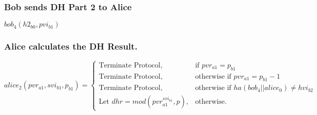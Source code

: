 \documentclass[11pt]{article}
\begin{document}
  \subsubsection{Bob sends DH Part 2 to Alice}
  $bob_4(h2_{b0},pvi_{b1})$

  \subsubsection{Alice calculates the DH Result.}
  \[
    alice_2(pvr_{a1},svi_{b1},p_{b1})=
    \begin{cases}
      \text{Terminate Protocol}, &\text{if } pvr_{a1} = p_{b1} \\
      \text{Terminate Protocol}, &\text{otherwise if } pvr_{a1} = p_{b1} - 1 \\
      \text{Terminate Protocol}, &\text{otherwise if } ha(bob_4||alice_0) \neq
      hvi_{b2} \\
      \text{Let $dhr = mod(pvr_{a1}^{svi_{b1}},p)$}, &\text{otherwise.}
    \end{cases}
  \]

 
\end{document}
